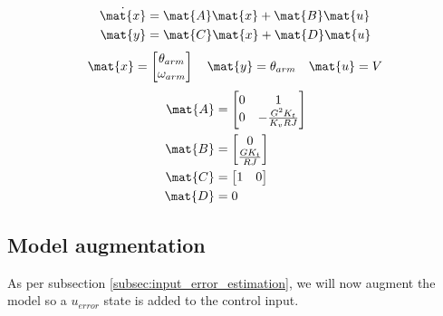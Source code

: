 \begin{theorem}
  \begin{align*}
    \dot{\mat{x}} &= \mat{A} \mat{x} + \mat{B} \mat{u} \\
    \mat{y} &= \mat{C} \mat{x} + \mat{D} \mat{u}
  \end{align*}
  \begin{equation*}
    \mat{x} =
    \begin{bmatrix}
      \theta_{arm} \\
      \omega_{arm}
    \end{bmatrix}
    \quad
    \mat{y} = \theta_{arm}
    \quad
    \mat{u} = V
  \end{equation*}
  \begin{align}
    \mat{A} &=
    \begin{bmatrix}
      0 & 1 \\
      0 & -\frac{G^2 K_t}{K_v RJ}
    \end{bmatrix} \\
    \mat{B} &=
    \begin{bmatrix}
      0 \\
      \frac{G K_t}{RJ}
    \end{bmatrix} \\
    \mat{C} &=
    \begin{bmatrix}
      1 & 0
    \end{bmatrix} \\
    \mat{D} &= 0
  \end{align}
\end{theorem}

\subsection{Model augmentation}

As per subsection \ref{subsec:input_error_estimation}, we will now augment the
\gls{model} so a $u_{error}$ state is added to the \gls{control input}.


